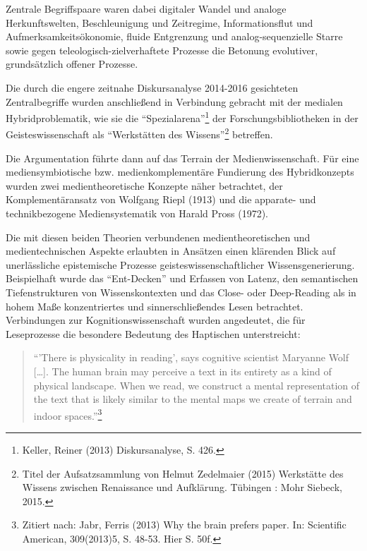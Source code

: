 \documentclass[a4paper,
fontsize=11pt,
oneside,
numbers=noperiodatend,
parskip=half-,
bibliography=totoc,
final
]{scrartcl}
\begin{document}
Zentrale Begriffspaare waren dabei digitaler Wandel und analoge
Herkunftswelten, Beschleunigung und Zeitregime, Informationsflut und
Aufmerksamkeitsökonomie, fluide Entgrenzung und analog-sequenzielle
Starre sowie gegen teleologisch-zielverhaftete Prozesse die Betonung
evolutiver, grundsätzlich offener Prozesse.

Die durch die engere zeitnahe Diskursanalyse 2014-2016 gesichteten
Zentralbegriffe wurden anschließend in Verbindung gebracht mit der
medialen Hybridproblematik, wie sie die \enquote{Spezialarena}\footnote{Keller,
  Reiner (2013) Diskursanalyse, S. 426.} der Forschungsbibliotheken in
der Geisteswissenschaft als \enquote{Werkstätten des Wissens}\footnote{Titel
  der Aufsatzsammlung von Helmut Zedelmaier (2015) Werkstätte des
  Wissens zwischen Renaissance und Aufklärung. Tübingen : Mohr Siebeck,
  2015.} betreffen.

Die Argumentation führte dann auf das Terrain der Medienwissenschaft.
Für eine mediensymbiotische bzw. medienkomplementäre Fundierung des
Hybridkonzepts wurden zwei medientheoretische Konzepte näher betrachtet,
der Komplementäransatz von Wolfgang Riepl (1913) und die apparate- und
technikbezogene Mediensystematik von Harald Pross (1972).

Die mit diesen beiden Theorien verbundenen medientheoretischen und
medientechnischen As\-pekt\-e erlaubten in Ansätzen einen klärenden Blick
auf unerlässliche epistemische Prozesse geisteswissenschaftlicher
Wissensgenerierung. Beispielhaft wurde das \enquote{Ent-Decken} und
Erfassen von Latenz, den semantischen Tiefenstrukturen von
Wissenskontexten und das Close- oder Deep-Reading als in hohem Maße
konzentriertes und sinnerschließendes Lesen betrachtet. Verbindungen zur
Kognitionswissenschaft wurden angedeutet, die für Leseprozesse die
besondere Bedeutung des Haptischen unterstreicht:

\begin{quote}
\enquote{'There is physicality in reading', says cognitive scientist
Maryanne Wolf {[}\ldots{}{]}. The human brain may perceive a text in its
entirety as a kind of physical landscape. When we read, we construct a
mental representation of the text that is likely similar to the mental
maps we create of terrain and indoor spaces.}\footnote{Zitiert nach:
  Jabr, Ferris (2013) Why the brain prefers paper. In: Scientific
  American, 309(2013)5, S. 48-53. Hier S. 50f.}
\end{quote}
\end{document}
